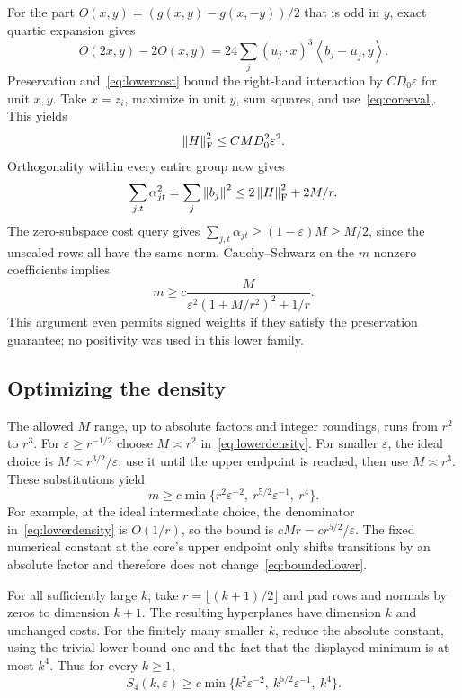 \documentclass[11pt]{article}
\theoremstyle{remark}\newtheorem{remark}[theorem]{Remark}
\newcommand{\norm}[1]{\left\lVert#1\right\rVert}\newcommand{\abs}[1]{\left|#1\right|}
\newcommand{\ip}[2]{\left\langle#1,#2\right\rangle}
\numberwithin{equation}{section}
\begin{document}
For the part $O(x,y)=(g(x,y)-g(x,-y))/2$ that is odd in $y$, exact quartic expansion gives
\begin{equation}\label{eq:lowerodd}
 O(2x,y)-2O(x,y)=24\sum_j(u_j\cdot x)^3\ip{b_j-\mu_j}{y}.
\end{equation}
Preservation and~\eqref{eq:lowercost} bound the right-hand interaction by $C D_0\varepsilon$ for unit $x,y$. Take $x=z_i$, maximize in unit $y$, sum squares, and use~\eqref{eq:coreeval}. This yields
\begin{equation}\label{eq:lowerH}
 \norm H_\Frob^2\le CM D_0^2\varepsilon^2.
\end{equation}
Orthogonality within every entire group now gives
\[
 \sum_{j,t}\alpha_{jt}^2=\sum_j\norm{b_j}^2
 \le2\norm H_\Frob^2+2M/r.
\]
The zero-subspace cost query gives $\sum_{j,t}\alpha_{jt}\ge(1-\varepsilon)M\ge M/2$, since the unscaled rows all have the same norm. Cauchy--Schwarz on the $m$ nonzero coefficients implies
\begin{equation}\label{eq:lowerdensity}
 m\ge c\frac{M}{\varepsilon^2(1+M/r^2)^2+1/r}.
\end{equation}
This argument even permits signed weights if they satisfy the preservation guarantee; no positivity was used in this lower family.

\subsection{Optimizing the density}
The allowed $M$ range, up to absolute factors and integer roundings, runs from $r^2$ to $r^3$. For $\varepsilon\ge r^{-1/2}$ choose $M\asymp r^2$ in~\eqref{eq:lowerdensity}. For smaller $\varepsilon$, the ideal choice is $M\asymp r^{3/2}/\varepsilon$; use it until the upper endpoint is reached, then use $M\asymp r^3$. These substitutions yield
\begin{equation}\label{eq:boundedlower}
 m\ge c\min\{r^2\varepsilon^{-2},\ r^{5/2}\varepsilon^{-1},\ r^4\}.
\end{equation}
For example, at the ideal intermediate choice, the denominator in~\eqref{eq:lowerdensity} is $O(1/r)$, so the bound is $cMr=cr^{5/2}/\varepsilon$. The fixed numerical constant at the core's upper endpoint only shifts transitions by an absolute factor and therefore does not change~\eqref{eq:boundedlower}.

For all sufficiently large $k$, take $r=\lfloor(k+1)/2\rfloor$ and pad rows and normals by zeros to dimension $k+1$. The resulting hyperplanes have dimension $k$ and unchanged costs. For the finitely many smaller $k$, reduce the absolute constant, using the trivial lower bound one and the fact that the displayed minimum is at most $k^4$. Thus for every $k\ge1$,
\begin{equation}\label{eq:lowerT}
 S_4(k,\varepsilon)\ge c\min\{k^2\varepsilon^{-2},\ k^{5/2}\varepsilon^{-1},\ k^4\}.
\end{equation}
\end{document}
